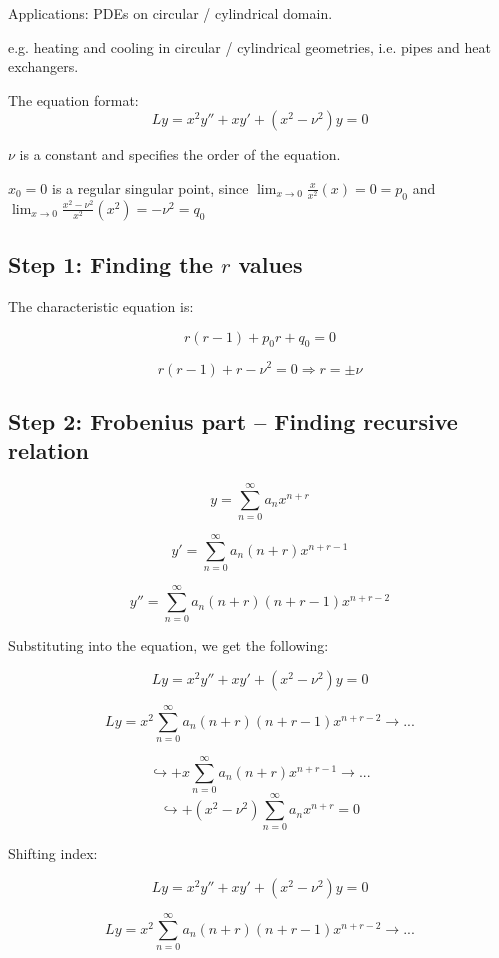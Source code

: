 \documentclass{article}
\begin{document}
Applications: PDEs on circular / cylindrical domain. 

e.g. heating and cooling in circular / cylindrical geometries, i.e. pipes and heat exchangers. 

\hfill

The equation format:
\begin{equation}
    \label{Bessel's Equation}
    Ly = x^2 y'' + xy' + \left(x^2 - \nu^2 \right) y = 0
\end{equation}

$\nu$ is a constant and specifies the order of the equation. 

$x_0 = 0$ is a regular singular point, since $\lim_{x \to 0} \frac{x}{x^2} (x) = 0 = p_0$ and $\lim_{x \to 0} \frac{x^2 - \nu^2}{x^2}(x^2) = - \nu^2 = q_0$

\subsection{Step 1: Finding the $r$ values}

The characteristic equation is:

$$r(r-1) + p_0 r + q_0 = 0$$

$$r(r-1) + r - \nu^2 = 0 \Rightarrow r = \pm \nu$$

\subsection{Step 2: Frobenius part -- Finding recursive relation}

$$y = \sum_{n = 0}^\infty a_n x^{n+r}$$

$$y' = \sum_{n =0}^{\infty} a_n (n+r)x^{n+r-1}$$

$$y'' = \sum_{n=0}^{\infty} a_n (n+r) (n+r-1) x^{n+r-2}$$

Substituting into the equation, we get the following:

$$Ly = x^2 y'' + xy' + \left(x^2 - \nu^2 \right) y = 0$$

$$Ly = x^2 \sum_{n=0}^{\infty} a_n (n+r) (n+r-1) x^{n+r-2} \rightarrow ...$$

$$ \hookrightarrow + x\sum_{n =0}^{\infty} a_n (n+r)x^{n+r-1} \rightarrow ...$$
$$ \hookrightarrow + \left(x^2 - \nu^2 \right) \sum_{n = 0}^\infty a_n x^{n+r} = 0$$

Shifting index:

$$Ly = x^2 y'' + xy' + \left(x^2 - \nu^2 \right) y = 0$$

$$Ly = x^2 \sum_{n=0}^{\infty} a_n (n+r) (n+r-1) x^{n+r-2} \rightarrow ...$$
\end{document}
